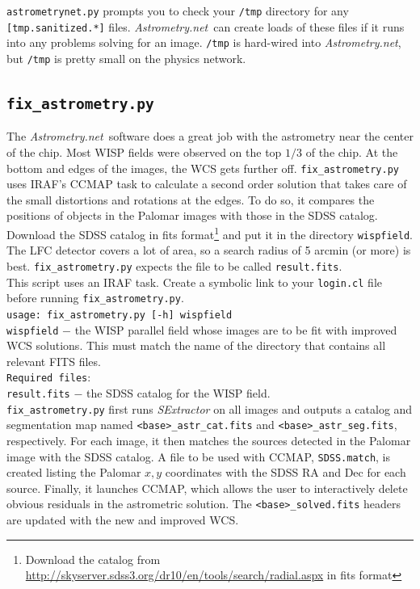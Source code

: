 \documentclass{article}
\newcommand{\An}{\textit{Astrometry.net}}
\begin{document}
\noindent \texttt{astrometrynet.py} prompts you to check your 
\texttt{/tmp} directory for any \texttt{[tmp.sanitized.*]} files.
\An\ can create loads of these files if it runs into any problems solving
for an image. \texttt{/tmp} is hard-wired into \An, but \texttt{/tmp} 
is pretty small on the physics network. \\

\subsection{\texttt{fix\_astrometry.py}}
The \An~software does a great job with the astrometry near the 
center of the chip. Most WISP fields
were observed on the top $1/3$ of the chip. At the bottom and edges of 
the images, the WCS gets further off. 
\texttt{fix\_astrometry.py} uses IRAF's CCMAP task to calculate
a second order solution that takes care of the small 
distortions and rotations at the edges. To do so, it compares the 
positions of objects in the Palomar images with those in the SDSS
catalog. Download the SDSS catalog in fits format\footnote{Download 
the catalog from
\url{http://skyserver.sdss3.org/dr10/en/tools/search/radial.aspx} in 
fits format} and put it in the directory \texttt{wispfield}. 
The LFC detector covers a lot of area, so a search
radius of 5 arcmin (or more) is best. 
\texttt{fix\_astrometry.py} expects the file to be called 
\texttt{result.fits}. \\

\noindent This script uses an IRAF task. Create a symbolic 
link to your \texttt{login.cl} file before running 
\texttt{fix\_astrometry.py}. \\

\texttt{usage: fix\_astrometry.py [-h] wispfield} \\

\texttt{wispfield} $-$ \hangindent=2.7cm the WISP parallel field whose images
are to be fit with improved WCS solutions. This must match the name of 
the directory that contains all relevant FITS files.\\

\texttt{Required files}: \\
\indent \indent \texttt{result.fits} $-$ the SDSS
catalog %
for the WISP field. \\

\noindent \texttt{fix\_astrometry.py} first runs \textit{SExtractor}
on all images and outputs a catalog and segmentation map named
\texttt{<base>\_astr\_cat.fits} and \texttt{<base>\_astr\_seg.fits},
respectively. For each image, it then matches the sources detected in the
Palomar image with the SDSS catalog. A file to be used with CCMAP, 
\texttt{SDSS.match}, is created
listing the Palomar $x,y$ coordinates with the SDSS RA and Dec for each 
source. Finally, it launches CCMAP, which allows the user to interactively
delete obvious residuals in the astrometric solution. The 
\texttt{<base>\_solved.fits} headers are updated with the new and 
improved WCS. 
\end{document}
